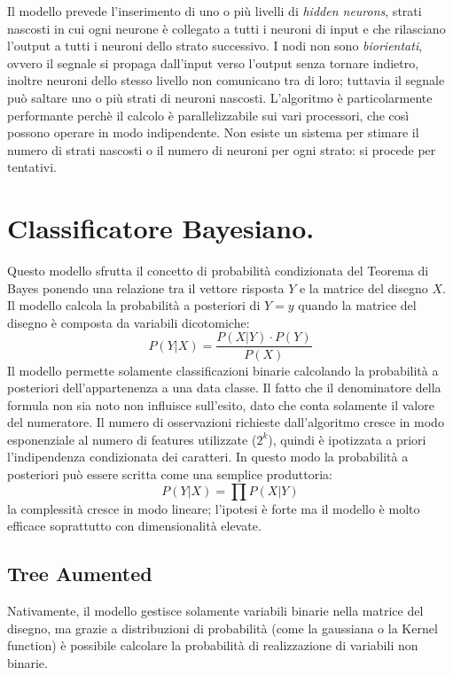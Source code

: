\documentclass[11pt, a4page, twocolumn]{article}
\begin{document}
Il modello prevede l'inserimento di uno o più livelli di \textit{hidden neurons}, strati nascosti in cui ogni neurone è collegato a tutti i neuroni di input e che rilasciano l'output a tutti i neuroni dello strato successivo.
I nodi non sono \textit{biorientati}, ovvero il segnale si propaga dall'input verso l'output senza tornare indietro, inoltre neuroni dello stesso livello non comunicano tra di loro; tuttavia il segnale può saltare uno o più strati di neuroni nascosti.
L'algoritmo è particolarmente performante perchè il calcolo è parallelizzabile sui vari processori, che così possono operare in modo indipendente.
Non esiste un sistema per stimare il numero di strati nascosti o il numero di neuroni per ogni strato: si procede per tentativi.


\section{Classificatore Bayesiano.}
Questo modello sfrutta il concetto di probabilità condizionata del Teorema di Bayes ponendo una relazione tra il vettore risposta $Y$ e la matrice del disegno $X$.
Il modello calcola la probabilità a posteriori di $Y = y$ quando la matrice del disegno è composta da variabili dicotomiche:
\begin{equation*}
  P(Y | X) = \frac{P(X | Y) \cdot P(Y)}{P(X)}
\end{equation*}
Il modello permette solamente classificazioni binarie calcolando la probabilità a posteriori dell'appartenenza a una data classe.
Il fatto che il denominatore della formula non sia noto non influisce sull'esito, dato che conta solamente il valore del numeratore.
Il numero di osservazioni richieste dall'algoritmo cresce in modo esponenziale al numero di features utilizzate ($2^k$), quindi è ipotizzata a priori l'indipendenza condizionata dei caratteri.
In questo modo la probabilità a posteriori può essere scritta come una semplice produttoria:
\begin{equation*}
  P(Y | X) = \prod{}{}{P(X | Y)}
\end{equation*}
la complessità cresce in modo lineare; l'ipotesi è forte ma il modello è molto efficace soprattutto con dimensionalità elevate.

\subsection{Tree Aumented}
Nativamente, il modello gestisce solamente variabili binarie nella matrice del disegno, ma grazie a distribuzioni di probabilità (come la gaussiana o la Kernel function) è possibile calcolare la probabilità di realizzazione di variabili non binarie.
\end{document}
